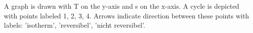 A graph is drawn with T on the y-axis and s on the x-axis. A cycle is depicted with points labeled 1, 2, 3, 4. Arrows indicate direction between these points with labels: 'isotherm', 'reversibel', 'nicht reversibel'.